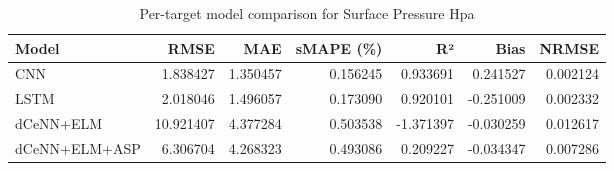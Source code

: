 \begin{table}
\caption{Per-target model comparison for Surface Pressure Hpa}
\begin{tabular}{lrrrrrr}
\toprule
Model & RMSE & MAE & sMAPE (\%) & R² & Bias & NRMSE \\
\midrule
CNN & 1.838427 & 1.350457 & 0.156245 & 0.933691 & 0.241527 & 0.002124 \\
LSTM & 2.018046 & 1.496057 & 0.173090 & 0.920101 & -0.251009 & 0.002332 \\
dCeNN+ELM & 10.921407 & 4.377284 & 0.503538 & -1.371397 & -0.030259 & 0.012617 \\
dCeNN+ELM+ASP & 6.306704 & 4.268323 & 0.493086 & 0.209227 & -0.034347 & 0.007286 \\
\bottomrule
\end{tabular}
\end{table}

